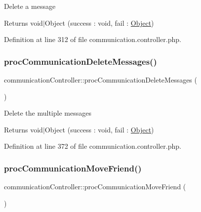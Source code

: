 Delete a message \begin{DoxyReturn}{Returns}
void$\vert$\+Object (success \+: void, fail \+: \hyperlink{classObject}{Object}) 
\end{DoxyReturn}


Definition at line 312 of file communication.\+controller.\+php.

\hypertarget{classcommunicationController_ac95be7a0206c59231d883d7fa4b17530}{}\label{classcommunicationController_ac95be7a0206c59231d883d7fa4b17530} 
\subsubsection{\texorpdfstring{proc\+Communication\+Delete\+Messages()}{procCommunicationDeleteMessages()}}
{\footnotesize\ttfamily communication\+Controller\+::proc\+Communication\+Delete\+Messages (\begin{DoxyParamCaption}{ }\end{DoxyParamCaption})}

Delete the multiple messages \begin{DoxyReturn}{Returns}
void$\vert$\+Object (success \+: void, fail \+: \hyperlink{classObject}{Object}) 
\end{DoxyReturn}


Definition at line 372 of file communication.\+controller.\+php.

\hypertarget{classcommunicationController_ab9cfbae9deca92f28d0c88da039a6083}{}\label{classcommunicationController_ab9cfbae9deca92f28d0c88da039a6083} 
\subsubsection{\texorpdfstring{proc\+Communication\+Move\+Friend()}{procCommunicationMoveFriend()}}
{\footnotesize\ttfamily communication\+Controller\+::proc\+Communication\+Move\+Friend (\begin{DoxyParamCaption}{ }\end{DoxyParamCaption})}

